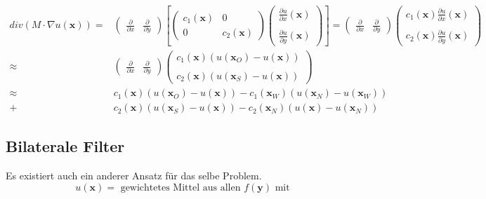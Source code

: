 \documentclass{article}
\theoremstyle{plain}
\theoremstyle{definition}
\numberwithin{equation}{section}
\newcommand{\x}[0] {
  \boldsymbol{x}
}
\newcommand{\y}[0] {
    \boldsymbol{y}
}
\begin{document}
\begin{enumerate}[label=\alph*)]
        \begin{align*}div(M \cdot \nabla u(\x)) =& \begin{pmatrix}
            \frac{\partial}{\partial x} & \frac{\partial}{\partial y}
        \end{pmatrix}
        \left[ \begin{pmatrix}
        c_1(\x) & 0\\
        0 & c_2(\x)
        \end{pmatrix}
        \begin{pmatrix}
            \frac{\partial u}{\partial x} (\x)\\
            \ \\
            \frac{\partial u}{\partial y} (\x)
        \end{pmatrix}
        \right]
        = \begin{pmatrix}
        \frac{\partial}{\partial x} & \frac{\partial}{\partial y}
        \end{pmatrix}
        \begin{pmatrix}
            c_1(\x) \frac{\partial u}{\partial x} (\x)\\
            \ \\
            c_2(\x) \frac{\partial u}{\partial y} (\x)
        \end{pmatrix}\\
        \approx & \begin{pmatrix}
        \frac{\partial}{\partial x} & \frac{\partial}{\partial y}
        \end{pmatrix}
        \begin{pmatrix}
            c_1(\x) (u(\x_O) - u(\x)) \\
            \ \\
            c_2(\x) (u(\x_S) - u(\x))
        \end{pmatrix}\\
        \approx & c_1(\x) (u(\x_O) - u(\x)) - c_1(\x_W)(u(\x_N) - u(\x_W))\\
        +&c_2(\x) (u(\x_S) - u(\x)) - c_2(\x_N)(u(\x) - u(\x_N))
        \end{align*}
      \end{enumerate}

      \subsection{Bilaterale Filter}
      Es existiert auch ein anderer Ansatz für das selbe Problem.
      \[u(\x) = \text{ gewichtetes Mittel aus allen } f(\y) \text{ mit}\]
\end{document}
